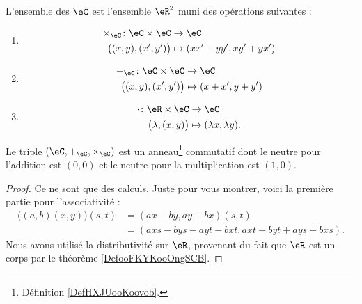 \begin{definition}
    L'ensemble des  \( \eC\) est l'ensemble \( \eR^2\) muni des opérations suivantes :
    \begin{enumerate}
        \item
            \begin{equation}        \label{EQooIJWOooZBiKEW}
                \begin{aligned}
                    \times_{\eC}\colon \eC\times \eC&\to \eC \\
                    \big( (x,y),(x',y') \big)&\mapsto (xx'-yy', xy'+yx') 
                \end{aligned}
            \end{equation}
        \item
            \begin{equation}
                \begin{aligned}
                    +_{\eC}\colon \eC\times \eC&\to \eC \\
                    \big( (x,y),(x',y') \big)&\mapsto (x+x', y+y') 
                \end{aligned}
            \end{equation}
        \item
            \begin{equation}
                \begin{aligned}
                    \cdot\colon \eR\times \eC&\to \eC \\
                    \big( \lambda,(x,y) \big)&\mapsto (\lambda x, \lambda y). 
                \end{aligned}
            \end{equation}
    \end{enumerate}
\end{definition}

\begin{lemma}
    Le triple \( (\eC,+_{\eC}, \times_{\eC})\) est un anneau\footnote{Définition \ref{DefHXJUooKoovob}.} commutatif dont le neutre pour l'addition est \( (0,0)\) et le neutre pour la multiplication est \( (1,0)\).
\end{lemma}

\begin{proof}
    Ce ne sont que des calculs. Juste pour vous montrer, voici la première partie pour l'associativité :
    \begin{subequations}
        \begin{align}
            \big( (a,b)(x,y) \big)(s,t)&=(ax-by,ay+bx)(s,t)\\
            &=(axs-bys-ayt-bxt,axt-byt+ays+bxs).
        \end{align}
    \end{subequations}
    Nous avons utilisé la distributivité sur \( \eR\), provenant du fait que \( \eR\) est un corps par le théorème \ref{DefooFKYKooOngSCB}.
\end{proof}

